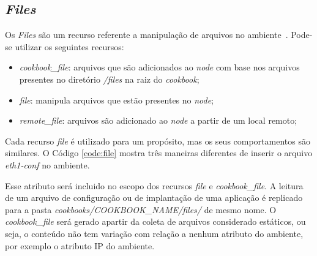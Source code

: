 \subsection{\textit{Files}}
\label{sec:cbfiles}

Os \textit{Files} são um recurso referente a manipulação de arquivos no ambiente~\cite{chefdoc:2016}.
Pode-se utilizar os seguintes recursos:

\begin{itemize}
  \item \textit{cookbook\_file}: arquivos que são adicionados ao \textit{node} com base
    nos arquivos presentes no diretório \textit{/files} na raiz do \textit{cookbook};
  \item \textit{file}: manipula arquivos que estão presentes no \textit{node};
  \item \textit{remote\_file}: arquivos são adicionado ao \textit{node} a partir de um
    local remoto;
\end{itemize}

Cada recurso \textit{file} é utilizado para um propósito, mas os seus comportamentos
são similares. O Código \ref{code:file} mostra três maneiras diferentes de
inserir o arquivo \textit{eth1-conf} no ambiente.

\begin{minipage}{.90\textwidth}
  \lstset{style=shell}
  
\end{minipage}

Esse atributo será incluido no escopo dos recursos \textit{file} e \textit{cookbook\_file}.
A leitura de um arquivo de configuração ou de implantação de uma aplicação 
é replicado para a pasta \textit{cookbooks/COOKBOOK\_NAME/files/} de mesmo nome.
O \textit{cookbook\_file} será gerado apartir da coleta de arquivos considerado estáticos,
ou seja, o conteúdo não tem variação com relação a nenhum atributo do ambiente,
por exemplo o atributo IP do ambiente.
